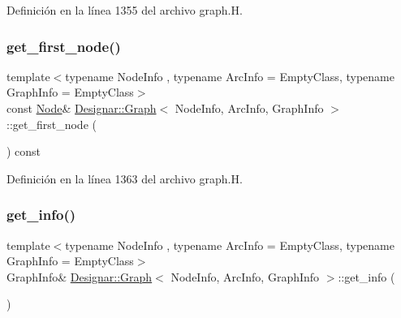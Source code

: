 Definición en la línea 1355 del archivo graph.\+H.

\mbox{\label{class_designar_1_1_graph_a2c27cdec559e9773deebec6f1af25a99}} 
\subsubsection{\texorpdfstring{get\+\_\+first\+\_\+node()}{get\_first\_node()}\hspace{0.1cm}{\footnotesize\ttfamily [2/2]}}
{\footnotesize\ttfamily template$<$typename Node\+Info , typename Arc\+Info  = Empty\+Class, typename Graph\+Info  = Empty\+Class$>$ \\
const \hyperlink{class_designar_1_1_graph_a5dfc7dba9d092ac489c72e40390c37d0}{Node}\& \hyperlink{class_designar_1_1_graph}{Designar\+::\+Graph}$<$ Node\+Info, Arc\+Info, Graph\+Info $>$\+::get\+\_\+first\+\_\+node (\begin{DoxyParamCaption}{ }\end{DoxyParamCaption}) const\hspace{0.3cm}{\ttfamily [inline]}}



Definición en la línea 1363 del archivo graph.\+H.

\mbox{\label{class_designar_1_1_graph_a5b84c02e86c7887333df2d8934079678}} 
\subsubsection{\texorpdfstring{get\+\_\+info()}{get\_info()}\hspace{0.1cm}{\footnotesize\ttfamily [1/2]}}
{\footnotesize\ttfamily template$<$typename Node\+Info , typename Arc\+Info  = Empty\+Class, typename Graph\+Info  = Empty\+Class$>$ \\
Graph\+Info\& \hyperlink{class_designar_1_1_graph}{Designar\+::\+Graph}$<$ Node\+Info, Arc\+Info, Graph\+Info $>$\+::get\+\_\+info (\begin{DoxyParamCaption}{ }\end{DoxyParamCaption})\hspace{0.3cm}{\ttfamily [inline]}}



